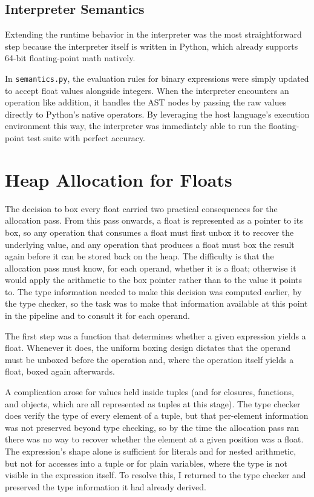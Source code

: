 \subsection{Interpreter Semantics}
Extending the runtime behavior in the interpreter was the most straightforward step because the interpreter itself is written in Python, which already supports 64-bit floating-point math natively.

In \texttt{semantics.py}, the evaluation rules for binary expressions were simply updated to accept float values alongside integers. When the interpreter encounters an operation like addition, it handles the AST nodes by passing the raw values directly to Python's native operators. By leveraging the host language's execution environment this way, the interpreter was immediately able to run the floating-point test suite with perfect accuracy.

\section{Heap Allocation for Floats}

The decision to box every float carried two practical consequences for the allocation pass. From this pass onwards, a float is represented as a pointer to its box, so any operation that consumes a float must first unbox it to recover the underlying value, and any operation that produces a float must box the result again before it can be stored back on the heap. The difficulty is that the allocation pass must know, for each operand, whether it is a float; otherwise it would apply the arithmetic to the box pointer rather than to the value it points to. The type information needed to make this decision was computed earlier, by the type checker, so the task was to make that information available at this point in the pipeline and to consult it for each operand.

The first step was a function that determines whether a given expression yields a float. Whenever it does, the uniform boxing design dictates that the operand must be unboxed before the operation and, where the operation itself yields a float, boxed again afterwards.

A complication arose for values held inside tuples (and for closures, functions, and objects, which are all represented as tuples at this stage). The type checker does verify the type of every element of a tuple, but that per-element information was not preserved beyond type checking, so by the time the allocation pass ran there was no way to recover whether the element at a given position was a float. The expression's shape alone is sufficient for literals and for nested arithmetic, but not for accesses into a tuple or for plain variables, where the type is not visible in the expression itself. To resolve this, I returned to the type checker and preserved the type information it had already derived.

